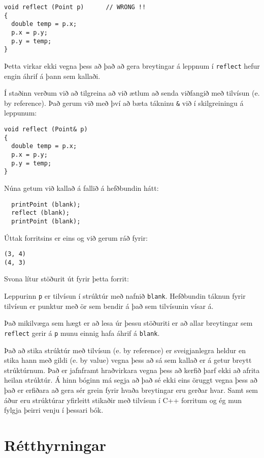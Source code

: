 \begin{verbatim}
void reflect (Point p)      // WRONG !!
{
  double temp = p.x;
  p.x = p.y;
  p.y = temp;
}
\end{verbatim}
%
Þetta virkar ekki vegna þess að það að gera breytingar á leppnum í {\tt reflect} hefur engin áhrif á þann sem kallaði.

Í staðinn verðum við að tilgreina að við ætlum að senda viðfangið með tilvísun (e. by reference).
Það gerum við með því að bæta tákninu {\tt \&} við í skilgreiningu á leppunum: 

\begin{verbatim}
void reflect (Point& p)
{
  double temp = p.x;
  p.x = p.y;
  p.y = temp;
}
\end{verbatim}
%
Núna getum við kallað á fallið á hefðbundin hátt:

\begin{verbatim}
  printPoint (blank);
  reflect (blank);
  printPoint (blank);
\end{verbatim}
%
Úttak forritsins er eins og við gerum ráð fyrir: 

\begin{verbatim}
(3, 4)
(4, 3)
\end{verbatim}
%
Svona lítur stöðurit út fyrir þetta forrit:

\vspace{0.1in}
\centerline{}
\vspace{0.1in}
%
Leppurinn {\tt p} er tilvísun í strúktúr með nafnið {\tt blank}.
Hefðbundin táknun fyrir tilvísun er punktur með ör sem bendir á það sem tilvísunin vísar á.

Það mikilvæga sem hægt er að lesa úr þessu stöðuriti er að allar breytingar sem 
{\tt reflect} gerir á {\tt p} munu einnig hafa áhrif á {\tt blank}.

Það að stika strúktúr með tilvísun (e. by reference) er sveigjanlegra heldur en stika hann með gildi (e. by value)
vegna þess að sá sem kallað er á getur breytt strúktúrnum.
Það er jafnframt hraðvirkara vegna þess að kerfið þarf ekki að afrita heilan strúktúr.
Á hinn bóginn má segja að það sé ekki eins öruggt vegna þess að það er erfiðara að gera sér grein fyrir hvaða breytingar eru gerðar hvar.
Samt sem áður eru strúktúrar yfirleitt stikaðir með tilvísun í C++ forritum og ég mun fylgja þeirri venju í þessari bók.

\section{Rétthyrningar}

